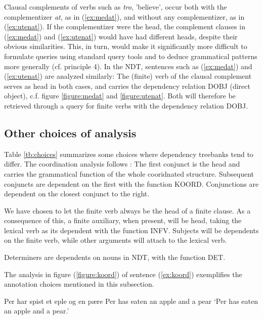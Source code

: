 \documentclass[11pt,a4paper]{article}
\begin{document}
Clausal complements of verbs such as \emph{tro}, 'believe', occur both with the complementizer \emph{at}, as in (\ref{ex:medat}), and without any complementizer, as in (\ref{ex:utenat}). If the complementizer were the head, the complement clauses in (\ref{ex:medat}) and (\ref{ex:utenat}) would have had different heads, despite their obvious similarities. This, in turn, would make it significantly more difficult to formulate queries using standard query tools and to deduce grammatical patterns more generally (cf. principle 4).
In the NDT,
sentences such as (\ref{ex:medat}) and (\ref{ex:utenat}) are analyzed similarly: The (finite) verb of the clausal complement serves as head in both cases, and carries the dependency relation DOBJ (direct object), c.f. figure \ref{figure:medat} and \ref{figure:utenat}.
Both will therefore be retrieved through a query for finite verbs with the dependency relation DOBJ.

\subsection{Other choices of analysis}
Table \ref{tb:choices} summarizes some choices where dependency treebanks tend to differ. The coordination analysis follows :
The first conjunct is the head and carries the grammatical function of the whole cooridnated structure. Subsequent conjuncts are dependent on the first with the function KOORD.
Conjunctions are dependent on the closest conjunct to the right.

We have chosen to let the finite verb always be the head of a finite clause. As a consequence of this, a finite auxiliary, when present, will be head, taking the lexical verb as its dependent with the function INFV.
Subjects will be dependents on the finite verb, while other arguments will attach to the lexical verb.

Determiners are dependents on nouns in NDT, with the function DET.

The analysis in figure (\ref{figure:koord}) of sentence (\ref{ex:koord}) exemplifies the annotation choices mentioned in this subsection.

\begin{examples}
\item\label{ex:koord}
\gll Per har spist et eple og en pære
Per has eaten an apple and a pear
\glt `Per has eaten an apple and a pear.'
\glend
\end{examples}
\end{document}
